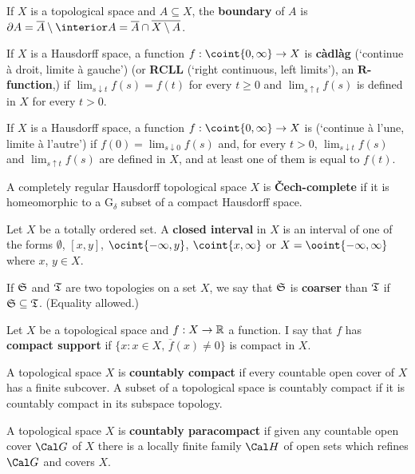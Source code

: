  If $X$ is a topological space and $A\subseteq X$, the
{\bf boundary} of $A$ is
$\partial A=\overline{A}\setminus\interior A
=\overline{A}\cap\overline{X\setminus A}$.

\glitem{\cadlag} If $X$ is a Hausdorff space, a function
$f:\coint{0,\infty}\to X$ is {\bf c\`adl\`ag}  (`continue \`a
droit, limite \`a gauche') (or {\bf RCLL}
(`right continuous, left limits'), an {\bf $\pmb{R}$-function},)
if $\lim_{s\downarrow t}f(s)=f(t)$
for every $t\ge 0$ and $\lim_{s\uparrow t}f(s)$ is defined in
$X$ for every $t>0$.

\glitem{\callal}  If $X$ is a Hausdorff space, a function
$f:\coint{0,\infty}\to X$ is {\bf\callal}  (`continue \`a l'une,
limite \`a l'autre') if $f(0)=\lim_{s\downarrow 0}f(s)$ and, for every
$t>0$, $\lim_{s\downarrow t}f(s)$ and $\lim_{s\uparrow t}f(s)$
are defined in $X$, and at least one of them is equal to $f(t)$.

 A completely regular Hausdorff topological
space
$X$ is {\bf \v{C}ech-complete} if it is homeomorphic to a G$_{\delta}$
subset of a compact Hausdorff space.


 Let $X$ be a totally ordered set.   A {\bf
closed interval} in $X$ is an interval of one of the forms $\emptyset$,
$[x,y]$,
$\ocint{-\infty,y}$, $\coint{x,\infty}$ or $X=\ooint{-\infty,\infty}$
where $x$, $y\in X$.

 If $\frak S$ and $\frak T$ are two topologies
on a set $X$, we say that $\frak S$ is {\bf coarser} than $\frak T$ if
$\frak S\subseteq\frak T$.   (Equality allowed.)

 Let $X$ be a topological space and
$f:X\to\Bbb R$
a function.   I say that $f$ has {\bf compact support} if
$\overline{\{x:x\in X,\,f(x)\ne 0\}}$ is compact in $X$.

 A topological space $X$ is {\bf countably
compact} if every countable open cover of $X$ has a finite subcover.
A subset of a topological space is countably compact if it is countably
compact in its subspace topology.

 A topological space $X$ is {\bf countably
paracompact} if given any countable open cover $\Cal G$ of $X$ there is
a locally finite family $\Cal H$ of open sets which refines $\Cal G$ and
covers $X$.

